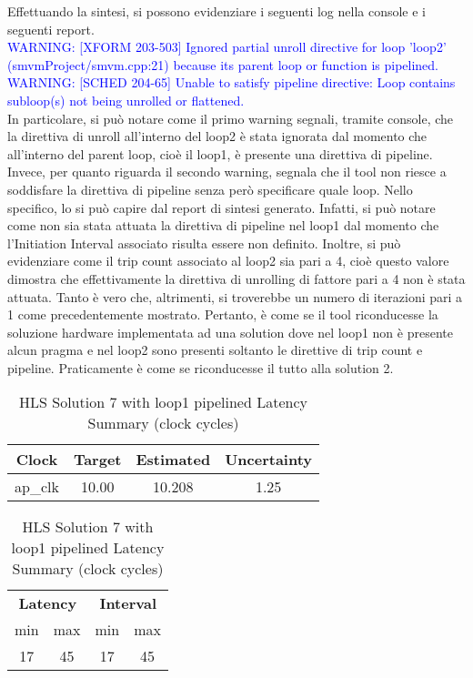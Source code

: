 

Effettuando la sintesi, si possono evidenziare i seguenti log nella console e i seguenti report.
\\
\textcolor{blue}{WARNING: [XFORM 203-503] Ignored partial unroll directive for loop 'loop2' (smvmProject/smvm.cpp:21) because its parent loop or function is pipelined.}
\\
\textcolor{blue}{WARNING: [SCHED 204-65] Unable to satisfy pipeline directive: Loop contains subloop(s) not being unrolled or flattened.}
\\
In particolare, si può notare come il primo warning segnali, tramite console, che la direttiva di unroll all'interno del loop2 è stata ignorata dal momento che all'interno del parent loop, cioè il loop1, è presente una direttiva di pipeline. Invece, per quanto riguarda il secondo warning, segnala che il tool non riesce a soddisfare la direttiva di pipeline senza però specificare quale loop. Nello specifico, lo si può capire dal report di sintesi generato. Infatti, si può notare come non sia stata attuata la direttiva di pipeline nel loop1 dal momento che l'Initiation Interval associato risulta essere non definito. Inoltre, si può evidenziare come il trip count associato al loop2 sia pari a 4, cioè questo valore dimostra che effettivamente la direttiva di unrolling di fattore pari a 4 non è stata attuata. Tanto è vero che, altrimenti, si troverebbe un numero di iterazioni pari a 1 come precedentemente mostrato. Pertanto, è come se il tool riconducesse la soluzione hardware implementata ad una solution dove nel loop1 non è presente alcun pragma e nel loop2 sono presenti soltanto le direttive di trip count e pipeline. Praticamente è come se riconducesse il tutto alla solution 2.

\begin{table}[H]
	\centering
	\begin{minipage}[t]{0.45\linewidth}
		\centering
		\begin{tabular}{|c|c|c|c|}
			\hline
			\textbf{Clock} & \textbf{Target} & \textbf{Estimated} & \textbf{Uncertainty} \\
			\hline
			ap\_clk & 10.00 & 10.208 & 1.25 \\
			\hline
		\end{tabular}
		\caption{HLS Solution 7 with loop1 pipelined Timing Summary (ns)}
		\label{tab:hls-solution-7-loop1-pipelined-timing-summary}
	\end{minipage}
	\hfill
	\begin{minipage}[t]{0.45\linewidth}
		\centering
		\begin{tabular}{|c|c|c|c|}
			\hline
			\multicolumn{2}{|c|}{\textbf{Latency}} & \multicolumn{2}{|c|}{\textbf{Interval}} \\
			min & max & min & max \\
			\hline
			17 & 45 & 17 & 45 \\
			\hline
		\end{tabular}
		\caption{HLS Solution 7 with loop1 pipelined Latency Summary (clock cycles)}
		\label{tab:hls-solution-7-loop1-pipeline-latency-summary}
	\end{minipage}
\end{table}

